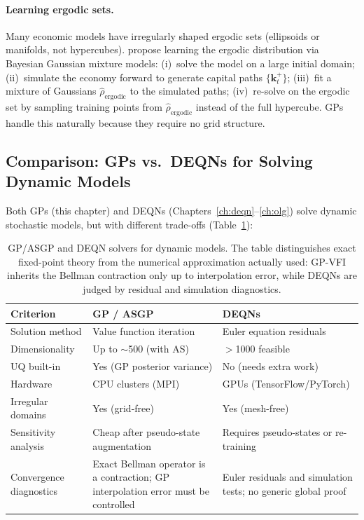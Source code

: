 \documentclass[11pt,a4paper]{report}
\begin{document}
\paragraph{Learning ergodic sets.}
Many economic models have irregularly shaped ergodic sets (ellipsoids or manifolds, not hypercubes).  \citet{SCHEIDEGGER201968} propose learning the ergodic distribution via Bayesian Gaussian mixture models: (i)~solve the model on a large initial domain; (ii)~simulate the economy forward to generate capital paths $\{\bm{k}_t^+\}$; (iii)~fit a mixture of Gaussians $\hat{\rho}_\mathrm{ergodic}$ to the simulated paths; (iv)~re-solve on the ergodic set by sampling training points from $\hat{\rho}_\mathrm{ergodic}$ instead of the full hypercube.  GPs handle this naturally because they require no grid structure.

\subsection{Comparison: GPs vs.\ DEQNs for Solving Dynamic Models}

Both GPs (this chapter) and DEQNs (Chapters~\ref{ch:deqn}--\ref{ch:olg}) solve dynamic stochastic models, but with different trade-offs (Table~\ref{tab:gp_vs_deqn_dynamic_models}):

\begin{table}[ht]
\centering
\small
\begin{tabular}{@{}p{3.4cm} p{4.7cm} p{4.7cm}@{}}
\toprule
\textbf{Criterion} & \textbf{GP / ASGP} & \textbf{DEQNs} \\
\midrule
Solution method & Value function iteration & Euler equation residuals \\
Dimensionality & Up to $\sim$500 (with AS) & $>$1000 feasible \\
UQ built-in & Yes (GP posterior variance) & No (needs extra work) \\
Hardware & CPU clusters (MPI) & GPUs (TensorFlow/PyTorch) \\
Irregular domains & Yes (grid-free) & Yes (mesh-free) \\
Sensitivity analysis & Cheap after pseudo-state augmentation & Requires pseudo-states or re-training \\
Convergence diagnostics & Exact Bellman operator is a contraction; GP interpolation error must be controlled & Euler residuals and simulation tests; no generic global proof \\
\bottomrule
\end{tabular}
\caption{GP/ASGP and DEQN solvers for dynamic models.  The table distinguishes exact fixed-point theory from the numerical approximation actually used: GP-VFI inherits the Bellman contraction only up to interpolation error, while DEQNs are judged by residual and simulation diagnostics.}
\label{tab:gp_vs_deqn_dynamic_models}
\end{table}
\end{document}
